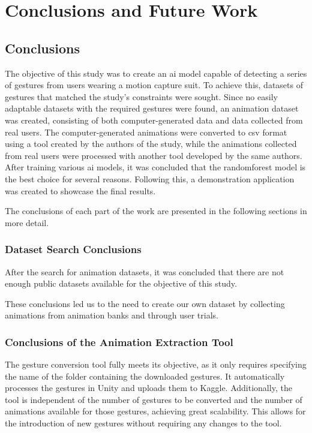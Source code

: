 \chapter*{Conclusions and Future Work}
\label{cap:conclusions}
\section{Conclusions}

The objective of this study was to create an \gls{ai} model capable of detecting a series of gestures from users wearing a motion capture suit. To achieve this, datasets of gestures that matched the study's constraints were sought. Since no easily adaptable datasets with the required gestures were found, an animation dataset was created, consisting of both computer-generated data and data collected from real users.
The computer-generated animations were converted to \gls{csv} format using a tool created by the authors of the study, while the animations collected from real users were processed with another tool developed by the same authors.
After training various \gls{ai} models, it was concluded that the \gls{randomforest} model is the best choice for several reasons. Following this, a demonstration application was created to showcase the final results.

The conclusions of each part of the work are presented in the following sections in more detail.

\subsection{Dataset Search Conclusions}

After the search for animation datasets, it was concluded that there are not enough public datasets available for the objective of this study.

These conclusions led us to the need to create our own dataset by collecting animations from animation banks and through user trials.

\subsection{Conclusions of the Animation Extraction Tool}

The gesture conversion tool fully meets its objective, as it only requires specifying the name of the folder containing the downloaded gestures. It automatically processes the gestures in Unity and uploads them to Kaggle.
Additionally, the tool is independent of the number of gestures to be converted and the number of animations available for those gestures, achieving great scalability. This allows for the introduction of new gestures without requiring any changes to the tool.



